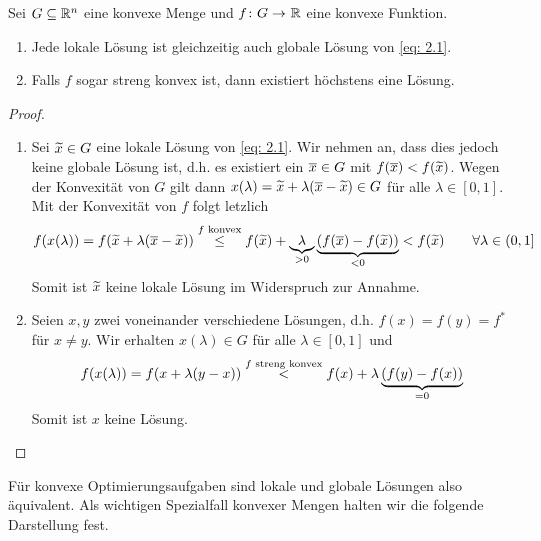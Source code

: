 \begin{satz} %
	Sei $G \subseteq \mathbb{R}^n$ eine konvexe Menge und $\abb{f}{G}{\R}$ eine konvexe Funktion.
	\begin{enumerate}[label=(\alph*)]
		\item Jede lokale Lösung ist gleichzeitig auch globale Lösung von \eqref{eq: 2.1}.
		\item Falls $f$ sogar streng konvex ist, dann existiert höchstens eine Lösung.
	\end{enumerate}
\end{satz}
\begin{proof}
	\begin{enumerate}[label=(zu \alph*), leftmargin=*]
		\item Sei $\widetilde{x} \in G$ eine lokale Lösung von \eqref{eq: 2.1}. Wir nehmen an, dass dies jedoch keine globale Lösung ist, d.h. es existiert ein $\overline{x} \in G$ mit $f(\overline{x}) < f(\widetilde{x})$. Wegen der Konvexität von $G$ gilt dann $x(\lambda) = \widetilde{x} + \lambda(\overline{x} - \widetilde{x}) \in G$ für alle $\lambda \in [0,1]$. Mit der Konvexität von $f$ folgt letzlich
		\begin{equation*}
			f(x(\lambda)) = f(\widetilde{x} + \lambda (\overline{x} - \widetilde{x})) 
			\overset{f \text{ konvex}}{\le} f(\widetilde{x}) + \underbrace{\lambda}_{> 0} \underbrace{\left( f(\overline{x}) - f(\widetilde{x}) \right)}_{< 0}
			< f(\widetilde{x}) \qquad \forall \lambda \in (0,1]
		\end{equation*}
		Somit ist $\widetilde{x}$ keine lokale Lösung im Widerspruch zur Annahme.
		\item Seien $x,y$ zwei voneinander verschiedene Lösungen, d.h. $f(x) = f(y) = f^\ast$ für $x \neq y$. Wir erhalten $x(\lambda) \in G$ für alle $\lambda \in [0,1]$ und
		\begin{equation*}
			f(x(\lambda)) = f(x + \lambda(y-x)) \overset{f \text{ streng konvex}}{<} f(x) + \lambda \underbrace{\left( f(y) - f(x) \right)}_{= 0}
		\end{equation*}
		Somit ist $x$ keine Lösung.
	\end{enumerate}
\end{proof}

Für konvexe Optimierungsaufgaben sind lokale und globale Lösungen also äquivalent. Als wichtigen Spezialfall konvexer Mengen halten wir die folgende Darstellung fest.

